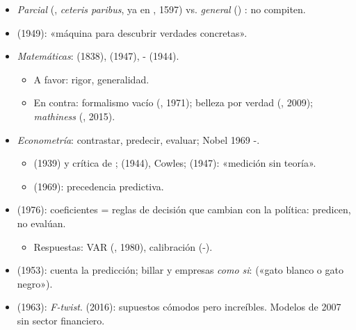 \documentclass{article}
\begin{document}
\begin{columnas}
\begin{itemize}
\item \emph{Parcial} (, \emph{ceteris paribus}, ya en , 1597) vs. \emph{general} () : no compiten.
\item {} (1949): «máquina para descubrir verdades concretas».
\end{itemize}
\begin{itemize}
\item \emph{Matemáticas}:  (1838),  (1947), - (1944).
  \begin{itemize}
  \item A favor: rigor, generalidad.
  \item En contra: formalismo vacío (, 1971); belleza por verdad (, 2009); \emph{mathiness} (, 2015).
  \end{itemize}
\item \emph{Econometría}: contrastar, predecir, evaluar; Nobel 1969 -.
  \begin{itemize}
  \item {} (1939) y crítica de ;  (1944), Cowles;  (1947): «medición sin teoría».
  \item {} (1969): precedencia predictiva.
  \end{itemize}
\item {} (1976): coeficientes = reglas de decisión que cambian con la política: predicen, no evalúan.
  \begin{itemize}
  \item Respuestas: VAR (, 1980), calibración (-).
  \end{itemize}
\end{itemize}
\begin{itemize}
\item {} (1953): cuenta la predicción; billar y empresas \emph{como si}:  («gato blanco o gato negro»).
\item {} (1963): \emph{F-twist}.  (2016): supuestos cómodos pero increíbles. Modelos de 2007 sin sector financiero.

\end{itemize}
\end{columnas}
\end{document}
